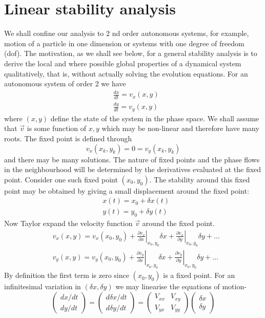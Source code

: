 \section{Linear stability analysis}
We shall confine our analysis to 2 nd order autonomous systems, for example, motion of a particle in one dimension or systems with one degree of freedom (dof). The motivation, as we shall see below, for a general stability analysis is to derive the local and where possible global properties of a dynamical system qualitatively, that is, without actually solving the evolution equations.
For an autonomous system of order 2 we have\\
$$\begin{aligned}
	&\frac{d x}{d t}=v_{x}(x, y) \\
	&\frac{d y}{d t}=v_{y}(x, y)
\end{aligned}$$
where $(x, y)$ define the state of the system in the phase space. We shall assume that $\vec{v}$ is some function of $x, y$ which may be non-linear and therefore have many roots. The fixed point is defined through
$$
v_{x}\left(x_{k}, y_{k}\right)=0=v_{y}\left(x_{k}, y_{k}\right)
$$
and there may be many solutions. The nature of fixed points and the phase flows in the neighbourhood will be determined by the derivatives evaluated at the fixed point.
Consider one such fixed point $\left(x_{0}, y_{0}\right)$. The stability around this fixed point may be obtained by giving a small displacement around the fixed point:
$$
\begin{aligned}
&x(t)=x_{0}+\delta x(t) \\
&y(t)=y_{0}+\delta y(t)
\end{aligned}
$$
Now Taylor expand the velocity function $\vec{v}$ around the fixed point.
$$
\begin{aligned}
&v_{x}(x, y)=v_{x}\left(x_{0}, y_{0}\right)+\left.\frac{\partial v_{x}}{\partial x}\right|_{x_{0}, y_{0}} \delta x+\left.\frac{\partial v_{x}}{\partial y}\right|_{x_{0}, y_{0}} \delta y+\ldots \\
&v_{y}(x, y)=v_{y}\left(x_{0}, y_{0}\right)+\left.\frac{\partial v_{y}}{\partial x}\right|_{x_{0}, y_{0}} \delta x+\left.\frac{\partial v_{y}}{\partial y}\right|_{x_{0}, y_{0}} \delta y+\ldots
\end{aligned}
$$
By definition the first term is zero since $\left(x_{0}, y_{0}\right)$ is a fixed point. For an infinitesimal variation in $(\delta x, \delta y)$ we may linearise the equations of motion-
$$
\left(\begin{array}{c}
d x / d t \\
d y / d t
\end{array}\right)=\left(\begin{array}{c}
d \delta x / d t \\
d \delta y / d t
\end{array}\right)=\left(\begin{array}{ll}
V_{x x} & V_{x y} \\
V_{y x} & V_{y y}
\end{array}\right)\left(\begin{array}{l}
\delta x \\
\delta y
\end{array}\right)
$$
